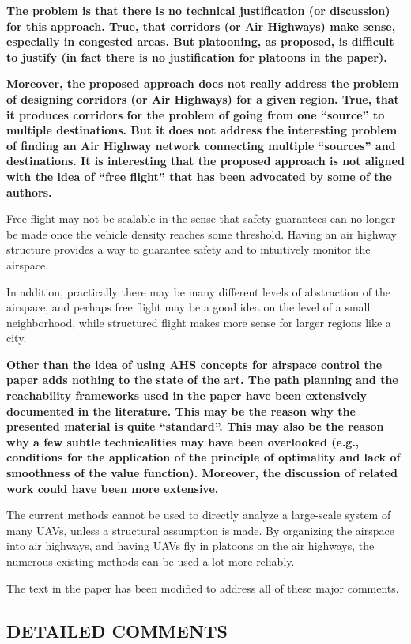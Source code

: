 \documentclass[submit]{aiaa-pretty}
\begin{document}
\textbf{The problem is that there is no technical justification (or discussion) for this approach. True, that corridors (or Air Highways) make sense, especially in congested areas. But platooning, as proposed, is difficult to justify (in fact there is no justification for platoons in the paper).}

\textbf{Moreover, the proposed approach does not really address the problem of designing corridors (or Air Highways) for a given region. True, that it produces corridors for the problem of going from one “source” to multiple destinations. But it does not address the interesting problem of finding an Air Highway network connecting multiple “sources” and destinations. It is interesting that the proposed approach is not aligned with the idea of “free flight” that has been advocated by some of the authors.}

Free flight may not be scalable in the sense that safety guarantees can no longer be made once the vehicle density reaches some threshold. Having an air highway structure provides a way to guarantee safety and to intuitively monitor the airspace. 

In addition, practically there may be many different levels of abstraction of the airspace, and perhaps free flight may be a good idea on the level of a small neighborhood, while structured flight makes more sense for larger regions like a city.

\textbf{Other than the idea of using AHS concepts for airspace control the paper adds nothing to the state of the art. The path planning and the reachability frameworks used in the paper have been extensively documented in the literature. This may be the reason why the presented material is quite “standard”. This may also be the reason why a few subtle technicalities may have been overlooked (e.g., conditions for the application of the principle of optimality and lack of smoothness of the value function). Moreover, the discussion of related work could have been more extensive.}

The current methods cannot be used to directly analyze a large-scale system of many UAVs, unless a structural assumption is made. By organizing the airspace into air highways, and having UAVs fly in platoons on the air highways, the numerous existing methods can be used a lot more reliably.

The text in the paper has been modified to address all of these major comments.

\subsection{DETAILED COMMENTS}
\end{document}
